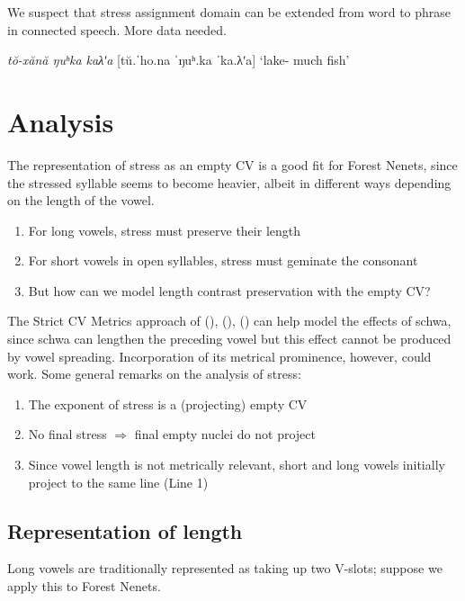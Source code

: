 \documentclass[a4paper, 12pt]{article}
\newcommand{\citeay}[2][]{
   \citeauthor{#2} (\citeyear[#1]{#2})}
\begin{document}
	We suspect that stress assignment domain can be extended from word to phrase in connected speech. More data needed.
	
	\ex\label{}\emph{tŏ-xănă ŋuʰka kaλʹa} [tŭ.ˈho.na ˈŋuʰ.ka ˈka.λʹa] \hfill `lake-{\Loc} much fish' \xe
	
	\section{Analysis}
	
	The representation of stress as an empty CV \parencite{scheersszigetvari2005} is a good fit for Forest Nenets, since the stressed syllable seems to become heavier, albeit in different ways depending on the length of the vowel.
	
	\begin{enumerate}[$\gg$]
		\item For long vowels, stress must preserve their length
		\item For short vowels in open syllables, stress must geminate the consonant
		\item But how can we model length contrast preservation with the empty CV?
	\end{enumerate}
	
	The Strict CV Metrics approach of \citeay{faust-ulfs2018}, \citeay{alexei-ulfs2022}, \citeay{ulfsbjorninntoappear} can help model the effects of schwa, since schwa can lengthen the preceding vowel but this effect cannot be produced by vowel spreading. Incorporation of its metrical prominence, however, could work. Some general remarks on the analysis of stress:
	
	\begin{enumerate}[$\gg$]
		\item The exponent of stress is a (projecting) empty CV
		\item No final stress $\Rightarrow$ final empty nuclei do not project 
		\item Since vowel length is not metrically relevant, short and long vowels initially project to the same line (Line 1) 
	\end{enumerate}
	
		\subsection{Representation of length}
		
	Long vowels are traditionally represented as taking up two V-slots; suppose we apply this to Forest Nenets.
	
\end{document}
